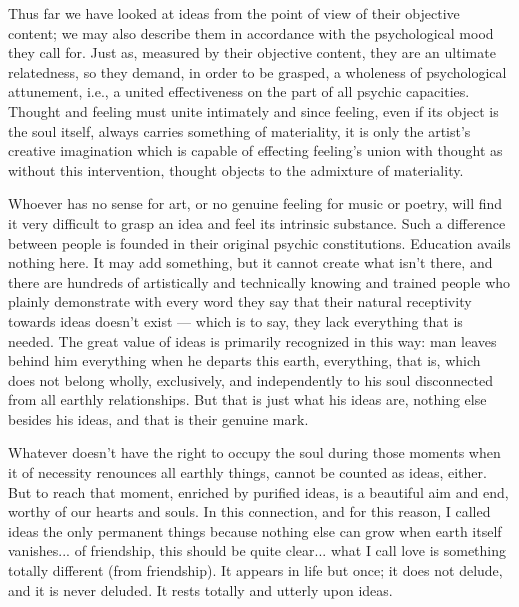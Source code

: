 \begin{quotationx}
Thus far we have looked at ideas from the point of view of their objective content; we may also describe them in accordance with the psychological mood they call for. Just as, measured by their objective content, they are an ultimate relatedness, so they demand, in order to be grasped, a wholeness of psychological attunement, i.e., a united effectiveness on the part of all psychic capacities. Thought and feeling must unite intimately and since feeling, even if its object is the soul itself, always carries something of materiality, it is only the artist's creative imagination which is capable of effecting feeling's union with thought as without this intervention, thought objects to the admixture of materiality.

Whoever has no sense for art, or no genuine feeling for music or poetry, will find it very difficult to grasp an idea and feel its intrinsic substance. Such a difference between people is founded in their original psychic constitutions. Education avails nothing here. It may add something, but it cannot create what isn't there, and there are hundreds of artistically and technically knowing and trained people who plainly demonstrate with every word they say that their natural receptivity towards ideas doesn't exist --- which is to say, they lack everything that is needed. The great value of ideas is primarily recognized in this way: man leaves behind him everything when he departs this earth, everything, that is, which does not belong wholly, exclusively, and independently to his soul disconnected from all earthly relationships. But that is just what his ideas are, nothing else besides his ideas, and that is their genuine mark.

Whatever doesn't have the right to occupy the soul during those moments when it of necessity renounces all earthly things, cannot be counted as ideas, either. But to reach that moment, enriched by purified ideas, is a beautiful aim and end, worthy of our hearts and souls. In this connection, and for this reason, I called ideas the only permanent things because nothing else can grow when earth itself vanishes... of friendship, this should be quite clear... what I call love is something totally different (from friendship). It appears in life but once; it does not delude, and it is never deluded. It rests totally and utterly upon ideas.
\end{quotationx}




